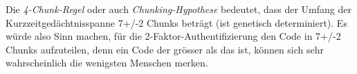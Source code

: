 Die \textit{4-Chunk-Regel} oder auch \textit{Chunking-Hypothese}
bedeutet, dass der Umfang der Kurzzeitgedächtnis­spanne 7+/-2 Chunks beträgt (ist genetisch
determiniert). Es würde also Sinn machen, für die 2-Faktor-Authentifizierung den Code in
7+/-2 Chunks aufzuteilen, denn ein Code der grösser als das ist, können sich sehr 
wahrscheinlich die wenigsten Menschen merken. 
